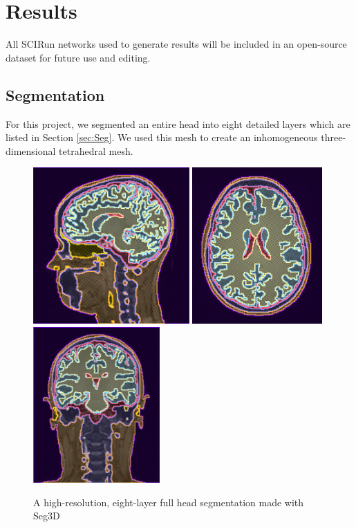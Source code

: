 %

\section{Results}
\label{sec:results}

All SCIRun networks used to generate results will be included in an open-source dataset for future use and editing.

\subsection{Segmentation}

For this project, we segmented an entire head into eight detailed layers which are listed in Section \ref{sec:Seg}. We used this mesh to create an inhomogeneous three-dimensional tetrahedral mesh. 

\begin{figure}[H]
\begin{center}
\includegraphics[height=2.35in]{Figures/seg_1}
\includegraphics[height=2.35in]{Figures/seg_2}
\includegraphics[height=2.35in]{Figures/seg_3}
\caption{A high-resolution, eight-layer full head segmentation made with Seg3D }
\label{fig:fullseg}
\end{center}
\end{figure}

